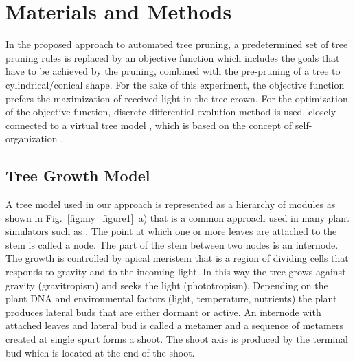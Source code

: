 \section{Materials and Methods}

In the proposed approach to automated tree pruning, a predetermined set
of tree pruning rules is replaced by an objective function which
includes the goals that have to be achieved by the pruning, combined
with the pre-pruning of a tree to cylindrical/conical shape. For the
sake of this experiment, the objective function prefers the maximization
of received light in the tree crown. For the optimization of the
objective function, discrete differential evolution method is used,
closely connected to a virtual tree model \cite{kohek_eduapple:_2015}, which is based on the
concept of self-organization \cite{palubicki_self-organizing_2009}.

\subsection{Tree Growth Model}

A tree model used in our approach is represented as a hierarchy of
modules as shown in Fig.~\ref{fig:my_figure1}~a) that is a common approach used in many plant
simulators such as \cite{de_reffye_plant_1988,palubicki_self-organizing_2009,pirk_plastic_2012,prusinkiewicz_development_1988,stava_inverse_2014}. The point at which one or more
leaves are attached to the stem is called a node. The part of the stem
between two nodes is an internode. The growth is controlled by apical
meristem that is a region of dividing cells that responds to gravity and
to the incoming light. In this way the tree grows against gravity
(gravitropism) and seeks the light (phototropism). Depending on the
plant DNA and environmental factors (light, temperature, nutrients) the
plant produces lateral buds that are either dormant or active. An
internode with attached leaves and lateral bud is called a metamer and a
sequence of metamers created at single spurt forms a shoot. The shoot
axis is produced by the terminal bud which is located at the end of the
shoot.

